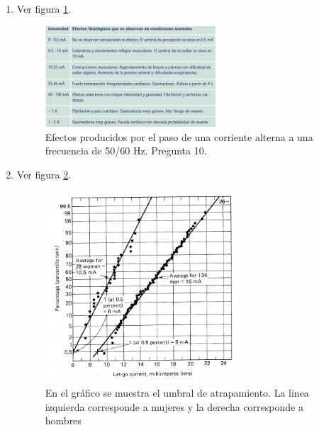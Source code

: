\begin{enumerate}[resume]
     \item %
     Ver figura \ref{figura pregunta 10}.
     \begin{figure}[H]
         \centering
         \includegraphics[width=0.6\textwidth]{Imagenes/Seguridad/S3/p10.png}
         \caption{Efectos producidos por el paso de una corriente alterna a una frecuencia de 50/60 Hz. Pregunta 10.}
         \label{figura pregunta 10}
     \end{figure}
     \item %
     Ver figura \ref{figura pregunta 11}.
     \begin{figure}[H]
         \centering
         \includegraphics[width=0.7\textwidth]{Imagenes/Seguridad/S3/p11.png}
         \caption{En el gráfico se muestra el umbral de atrapamiento.  La linea izquierda corresponde a mujeres y la derecha corresponde a hombres}
         \label{figura pregunta 11}
     \end{figure}
     

\end{enumerate}
